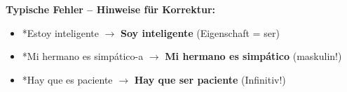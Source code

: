 \documentclass[11pt,a4paper]{article}
\newcommand{\lsg}[1]{\textcolor{loesung}{\textbf{#1}}}
\begin{document}
\vspace{0.5em}
\textbf{Typische Fehler -- Hinweise für Korrektur:}
\begin{itemize}[leftmargin=1.5em, nosep]
    \item \textcolor{loesung}{*Estoy inteligente} $\rightarrow$ \lsg{Soy inteligente} (Eigenschaft = ser)
    \item \textcolor{loesung}{*Mi hermano es simpático-a} $\rightarrow$ \lsg{Mi hermano es simpático} (maskulin!)
    \item \textcolor{loesung}{*Hay que es paciente} $\rightarrow$ \lsg{Hay que ser paciente} (Infinitiv!)
\end{itemize}
\end{document}
